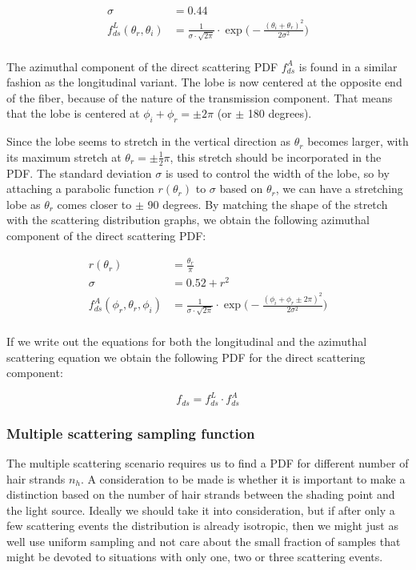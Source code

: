 \documentclass[11pt,a4paper]{report}
\begin{document}
\begin{align*}
\sigma &= 0.44 \\
 f_{ds}^L(\theta_r, \theta_i) &= \frac{1}{\sigma \cdot \sqrt{2 \pi}} \cdot \exp \Big ( -\frac{(\theta_i + \theta_r)^2}{2 \sigma^2} \Big ) \\
\end{align*}


The azimuthal component of the direct scattering PDF $f_{ds}^A$ is found in a similar fashion as the longitudinal variant. The lobe is now centered at the opposite end of the fiber, because of the nature of the transmission component. That means that the lobe is centered at $\phi_i + \phi_r = \pm 2\pi$ (or $\pm$ 180 degrees). 

Since the lobe seems to stretch in the vertical direction as $\theta_r$ becomes larger, with its maximum stretch at $\theta_r = \pm \frac{1}{2} \pi$, this stretch should be incorporated in the PDF. The standard deviation $\sigma$ is used to control the width of the lobe, so by attaching a parabolic function $r(\theta_r)$ to $\sigma$ based on $\theta_r$, we can have a stretching lobe as $\theta_r$ comes closer to $\pm$ 90 degrees. By matching the shape of the stretch with the scattering distribution graphs, we obtain the following azimuthal component of the direct scattering PDF: 

\begin{align*}
r(\theta_r) &= \frac{\theta_r}{\pi} \\
\sigma &= 0.52 + r^2 \\
 f_{ds}^A(\phi_r, \theta_r, \phi_i) &= \frac{1}{\sigma \cdot \sqrt{2 \pi}} \cdot \exp \Big ( -\frac{(\phi_i + \phi_r \pm 2\pi)^2}{2 \sigma^2} \Big ) \\
\end{align*}

If we write out the equations for both the longitudinal and the azimuthal scattering equation we obtain the following PDF for the direct scattering component:

\begin{equation}
f_{ds} = f_{ds}^L \cdot f_{ds}^A
\end{equation}



\subsubsection{Multiple scattering sampling function}

The multiple scattering scenario requires us to find a PDF for different number of hair strands $n_h$. A consideration to be made is whether it is important to make a distinction based on the number of hair strands between the shading point and the light source. Ideally we should take it into consideration, but if after only a few scattering events the distribution is already isotropic, then we might just as well use uniform sampling and not care about the small fraction of samples that might be devoted to situations with only one, two or three scattering events.
\end{document}
